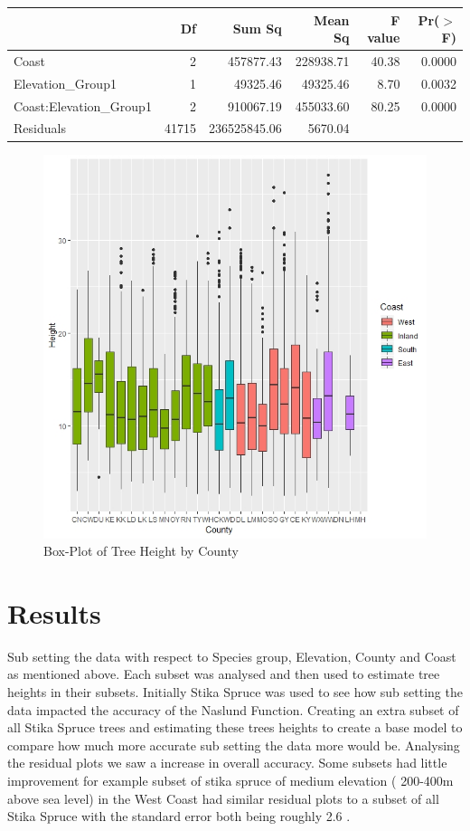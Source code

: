 \documentclass[a4paper,11pt,twoside]{report}
\begin{document}
\begin{table}[ht]
\centering
\begin{tabular}{lrrrrr}
  \hline
 & Df & Sum Sq & Mean Sq & F value & Pr($>$F) \\ 
  \hline
Coast & 2 & 457877.43 & 228938.71 & 40.38 & 0.0000 \\ 
  Elevation\_Group1 & 1 & 49325.46 & 49325.46 & 8.70 & 0.0032 \\ 
  Coast:Elevation\_Group1 & 2 & 910067.19 & 455033.60 & 80.25 & 0.0000 \\ 
  Residuals & 41715 & 236525845.06 & 5670.04 &  &  \\ 
   \hline
\end{tabular}
\end{table}
\begin{figure}[t]
    \centering
 \includegraphics[width=.9\linewidth]{Images/County Height by Coast.jpeg}
  \caption{Box-Plot of Tree Height by County}
  \label{fig:Box-Plot of Tree Height by County}
\end{figure}

\chapter{Results}

Sub setting the data with respect to Species group, Elevation, County and Coast as mentioned above. Each subset was analysed and then used to estimate tree heights in their subsets. Initially Stika Spruce was used to see how sub setting the data impacted the accuracy of the Naslund Function. Creating an extra subset of all Stika Spruce trees and estimating these trees heights to create a base model to compare how much more accurate sub setting the data more would be. Analysing the residual plots we saw a increase in overall accuracy. Some subsets had little improvement for example subset of stika spruce of medium elevation ( 200-400m above sea level) in the West Coast had similar residual plots to a subset of all Stika Spruce with the standard error both being roughly 2.6 . \\
\end{document}
